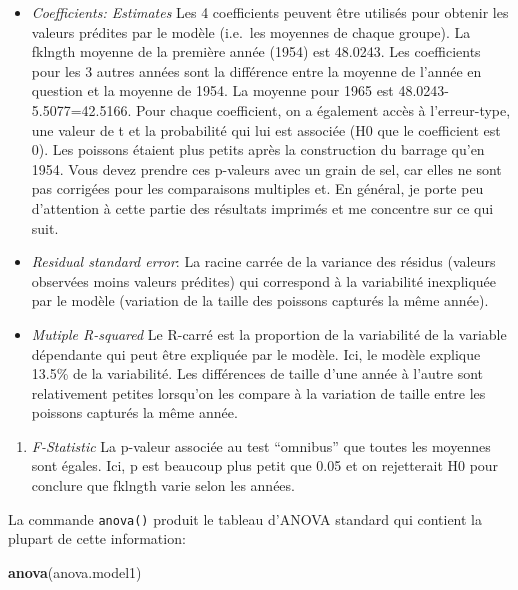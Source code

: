 \documentclass[12pt,]{book}
\newenvironment{Shaded}{\begin{snugshade}}{\end{snugshade}}
\newcommand{\KeywordTok}[1]{\textcolor[rgb]{0.27,0.27,0.27}{\textbf{#1}}}
\newcommand{\NormalTok}[1]{#1}
\providecommand{\tightlist}{%
  \setlength{\itemsep}{0pt}\setlength{\parskip}{0pt}}
\begin{document}
\begin{itemize}
\tightlist
\item
  \emph{Coefficients: Estimates} Les 4 coefficients peuvent être utilisés pour obtenir les valeurs prédites par le modèle (i.e.~les moyennes de chaque groupe). La fklngth moyenne de la première année (1954) est 48.0243. Les coefficients pour les 3 autres années sont la différence entre la moyenne de l'année en question et la moyenne de 1954. La moyenne pour 1965 est 48.0243-5.5077=42.5166. Pour chaque coefficient, on a également accès à l'erreur-type, une valeur de t et la probabilité qui lui est associée (H0 que le coefficient est 0). Les poissons étaient plus petits après la construction du barrage qu'en 1954. Vous devez prendre ces p-valeurs avec un grain de sel, car elles ne sont pas corrigées pour les comparaisons multiples et. En général, je porte peu d'attention à cette partie des résultats imprimés et me concentre sur ce qui suit.
\item
  \emph{Residual standard error}: La racine carrée de la variance des résidus (valeurs observées moins valeurs prédites) qui correspond à la variabilité inexpliquée par le modèle (variation de la taille des poissons capturés la même année).
\item
  \emph{Mutiple R-squared} Le R-carré est la proportion de la variabilité de la variable dépendante qui peut être expliquée par le modèle. Ici, le modèle explique 13.5\% de la variabilité. Les différences de taille d'une année à l'autre sont relativement petites lorsqu'on les compare à la variation de taille entre les poissons capturés la même année.
\end{itemize}

\begin{enumerate}
\def\labelenumi{\arabic{enumi}.}
\setcounter{enumi}{3}
\tightlist
\item
  \emph{F-Statistic} La p-valeur associée au test ``omnibus'' que toutes les moyennes sont égales. Ici, p est beaucoup plus petit que 0.05 et on rejetterait H0 pour conclure que fklngth varie selon les années.
\end{enumerate}

La commande \texttt{anova()} produit le tableau d'ANOVA standard qui contient la plupart de cette information:

\begin{Shaded}
\begin{Highlighting}[]
\KeywordTok{anova}\NormalTok{(anova.model1)}
\end{Highlighting}
\end{Shaded}
\end{document}
